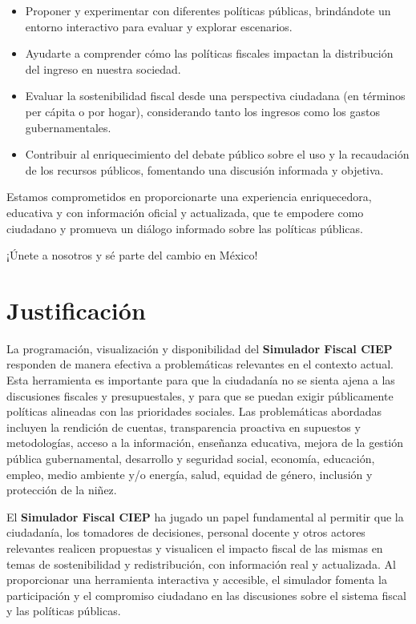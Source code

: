 \begin{itemize}
    \item Proponer y experimentar con diferentes políticas públicas, brindándote un entorno interactivo para evaluar y explorar escenarios.
    \item Ayudarte a comprender cómo las políticas fiscales impactan la distribución del ingreso en nuestra sociedad.
    \item Evaluar la sostenibilidad fiscal desde una perspectiva ciudadana (en términos per cápita o por hogar), considerando tanto los ingresos como los gastos gubernamentales.
    \item Contribuir al enriquecimiento del debate público sobre el uso y la recaudación de los recursos públicos, fomentando una discusión informada y objetiva.
\end{itemize}

Estamos comprometidos en proporcionarte una experiencia enriquecedora, educativa y con información oficial y actualizada, que te empodere como ciudadano y promueva un diálogo informado sobre las políticas públicas.

¡Únete a nosotros y sé parte del cambio en México!

\section{Justificación}

La programación, visualización y disponibilidad del \textbf{Simulador Fiscal \acs{CIEP}} responden de manera efectiva a problemáticas relevantes en el contexto actual. Esta herramienta es importante para que la ciudadanía no se sienta ajena a las discusiones fiscales y presupuestales, y para que se puedan exigir públicamente políticas alineadas con las prioridades sociales. Las problemáticas abordadas incluyen la rendición de cuentas, transparencia proactiva en supuestos y metodologías, acceso a la información, enseñanza educativa, mejora de la gestión pública gubernamental, desarrollo y seguridad social, economía, educación, empleo, medio ambiente y/o energía, salud, equidad de género, inclusión y protección de la niñez.

El \textbf{Simulador Fiscal \acs{CIEP}} ha jugado un papel fundamental al permitir que la ciudadanía, los tomadores de decisiones, personal docente y otros actores relevantes realicen propuestas y visualicen el impacto fiscal de las mismas en temas de sostenibilidad y redistribución, con información real y actualizada. Al proporcionar una herramienta interactiva y accesible, el simulador fomenta la participación y el compromiso ciudadano en las discusiones sobre el sistema fiscal y las políticas públicas.

